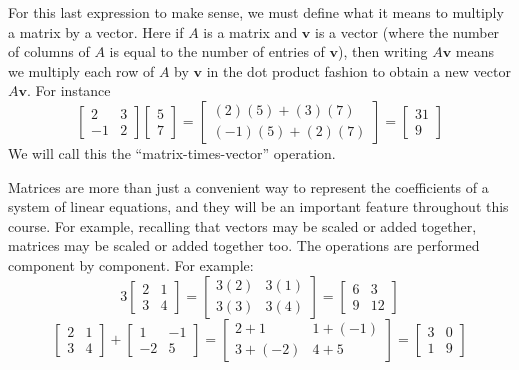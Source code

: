 \documentclass[11pt,oneside]{amsbook}
\theoremstyle{definition}
\theoremstyle{plain}
\theoremstyle{definition}
\theoremstyle{remark}
\numberwithin{equation}{section}
\numberwithin{figure}{section}
\begin{document}
For this last expression to make sense, we must define what it means to multiply a matrix by a vector. Here if $A$ is a matrix and $\bm{v}$ is a vector (where the number of columns of $A$ is equal to the number of entries of $\bm{v}$), then writing $A\bm{v}$ means we multiply each row of $A$ by  $\bm{v}$ in the dot product fashion to obtain a new vector $A\bm{v}$. For instance
\[\begin{bmatrix}2&3\\-1&2\end{bmatrix}
  \begin{bmatrix}5\\7\end{bmatrix}
  =\begin{bmatrix}(2)(5)+(3)(7)\\(-1)(5)+(2)(7)\end{bmatrix}
  =\begin{bmatrix}31\\9\end{bmatrix}
\]
We will call this the ``matrix-times-vector'' operation.

Matrices are more than just a convenient way to represent the coefficients of a system of linear equations, and they will be an important feature throughout this course. For example, recalling that vectors may be scaled or added together, matrices may be scaled or added together too. The operations are performed component by component. For example:
\[3\begin{bmatrix}2&1\\3&4\end{bmatrix}
  =\begin{bmatrix}3(2)&3(1)\\3(3)&3(4)\end{bmatrix}
  =\begin{bmatrix}6&3\\9&12\end{bmatrix}
\]
\[\begin{bmatrix}2&1\\3&4\end{bmatrix}
  +\begin{bmatrix}1&-1\\-2&5\end{bmatrix}
  =\begin{bmatrix}2+1&1+(-1)\\3+(-2)&4+5\end{bmatrix}
  =\begin{bmatrix}3&0\\1&9\end{bmatrix}
\]
\end{document}
